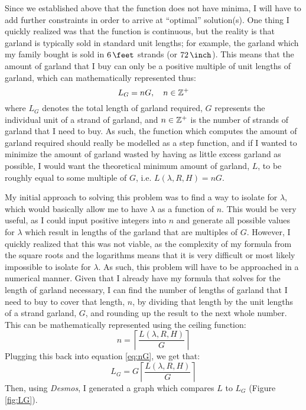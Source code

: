 Since we established above that the function does not have minima, I will have to add further constraints in order to arrive at ``optimal'' solution(s). One thing I quickly realized was that the function is continuous, but the reality is that garland is typically sold in standard unit lengths; for example, the garland which my family bought is sold in $\US{6}{\feet}$ strands (or $\US{72}{\inch}$). This means that the amount of garland that I buy can only be a positive multiple of unit lengths of garland, which can mathematically represented thus:
\begin{equation}
    L_G = nG,\quad n \in \mathbb{Z}^+ \label{eq:nG}
\end{equation}
where $L_G$ denotes the total length of garland required, $G$ represents the individual unit of a strand of garland, and $n\in \mathbb{Z}^+$ is the number of strands of garland that I need to buy. As such, the function which computes the amount of garland required should really be modelled as a step function, and if I wanted to minimize the amount of garland wasted by having as little excess garland as possible, I would want the theoretical minimum amount of garland, $L$, to be roughly equal to some multiple of $G$, i.e. $L(\lambda, R, H) = nG$.

My initial approach to solving this problem was to find a way to isolate for $\lambda$, which would basically allow me to have $\lambda$ as a function of $n$. This would be very useful, as I could input positive integers into $n$ and generate all possible values for $\lambda$ which result in lengths of the garland that are multiples of $G$. However, I quickly realized that this was not viable, as the complexity of my formula from the square roots and the logarithms means that it is very difficult or most likely impossible to isolate for $\lambda$. As such, this problem will have to be approached in a numerical manner. Given that I already have my formula that solves for the length of garland necessary, I can find the number of lengths of garland that I need to buy to cover that length, $n$, by dividing that length by the unit lengths of a strand garland, $G$, and rounding up the result to the next whole number. This can be mathematically represented using the ceiling function:
\begin{equation}
    n = \left\lceil \frac{L(\lambda, R, H)}{G} \right\rceil
\end{equation}
Plugging this back into equation \ref{eq:nG}, we get that:
\begin{equation}
    L_G = G\left\lceil \frac{L(\lambda, R, H)}{G} \right\rceil
\end{equation}
Then, using \emph{Desmos}, I generated a graph which compares $L$ to $L_G$ (Figure \ref{fig:LG}).

